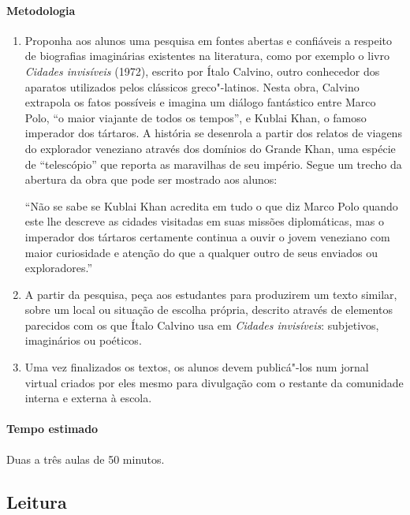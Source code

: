 \documentclass[12pt]{extarticle}
\begin{document}
 \paragraph{Metodologia}
 	\begin{enumerate}
	\item
	Proponha aos alunos uma pesquisa em fontes abertas e confiáveis a respeito de biografias
	imaginárias existentes na literatura, como por exemplo o livro \emph{Cidades invisíveis} 
	(1972), escrito por Ítalo Calvino, outro conhecedor dos aparatos utilizados pelos clássicos
	greco"-latinos. Nesta obra, Calvino extrapola os fatos possíveis 
	e imagina um diálogo fantástico entre Marco Polo, ``o maior viajante de todos os tempos'', 
	e Kublai Khan, o famoso imperador dos tártaros. A história se desenrola a partir 
	dos relatos de viagens do explorador veneziano através dos domínios do 
	Grande Khan, uma espécie de ``telescópio'' que reporta as maravilhas de seu império.
	Segue um trecho da abertura da obra que pode ser mostrado aos alunos:

``Não se sabe se Kublai Khan acredita em tudo o que diz Marco Polo quando este lhe descreve as cidades visitadas em suas missões diplomáticas, mas o imperador dos tártaros certamente continua a ouvir o jovem veneziano com maior curiosidade e atenção do que a qualquer outro de seus enviados ou exploradores.''

	\item
	A partir da pesquisa, peça aos estudantes para produzirem um texto similar, 
	sobre um local ou situação de escolha própria, descrito 
	através de elementos parecidos com os que Ítalo Calvino usa 
	em \emph{Cidades invisíveis}: subjetivos, imaginários ou poéticos.
	\item
	Uma vez finalizados os textos, os alunos devem publicá"-los num jornal virtual
	criados por eles mesmo para divulgação com o restante da comunidade interna e 
	externa à escola.
 	\end{enumerate}

 \paragraph{Tempo estimado} Duas a três aulas de 50 minutos.



\subsection{Leitura}
\end{document}
